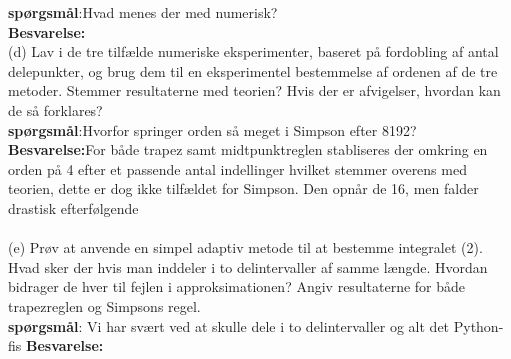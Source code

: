 \textbf{spørgsmål}:Hvad menes der med numerisk?\\
\textbf{Besvarelse:} \\
(d) Lav i de tre tilfælde numeriske eksperimenter, baseret på fordobling af antal delepunkter, og brug dem til en eksperimentel bestemmelse af ordenen af de tre
metoder. Stemmer resultaterne med teorien? Hvis der er afvigelser, hvordan kan
de så forklares?\\
\textbf{spørgsmål}:Hvorfor springer orden så meget i Simpson efter 8192? \\
\textbf{Besvarelse:}For både trapez samt midtpunktreglen stabliseres der omkring en orden på 4 efter et passende antal indellinger hvilket stemmer overens med teorien, dette er dog ikke tilfældet for Simpson. Den opnår de 16, men falder drastisk efterfølgende \\\\
(e) Prøv at anvende en simpel adaptiv metode til at bestemme integralet (2). Hvad
sker der hvis man inddeler i to delintervaller af samme længde. Hvordan bidrager
de hver til fejlen i approksimationen? Angiv resultaterne for både trapezreglen og
Simpsons regel. \\
\textbf{spørgsmål}: Vi har svært ved at skulle dele i to delintervaller og alt det Python-fis
\textbf{Besvarelse:} \\
%
